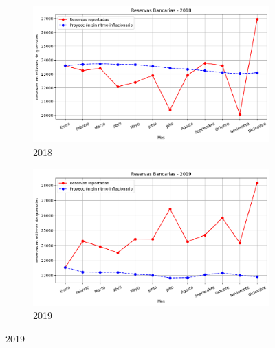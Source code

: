 \begin{figure}[H]
  \centering
  \captionsetup{justification=centering}

  \begin{subfigure}[b]{0.495\textwidth}
    \includegraphics[width=\linewidth]{imagenes/retro_2018.png}
    \caption{2018}
    \label{proyeccion retro}
  \end{subfigure}
  \begin{subfigure}[b]{0.495\textwidth}
    \includegraphics[width=\linewidth]{imagenes/retro_2019.png}
    \caption{2019}
  \end{subfigure}
  

\end{figure}
